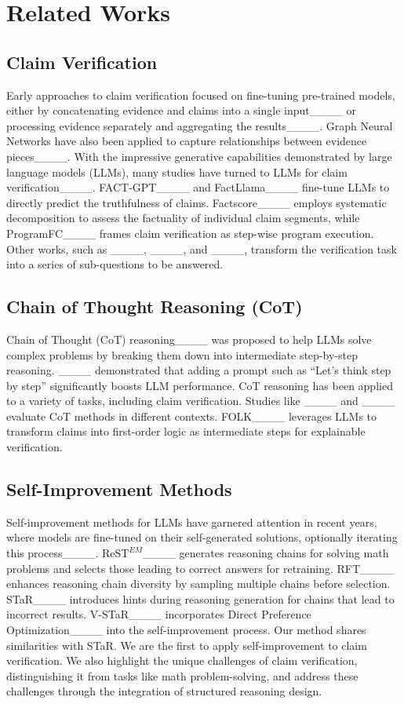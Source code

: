 \section{Related Works}
\subsection{Claim Verification}

Early approaches to claim verification focused on fine-tuning pre-trained models, either by concatenating evidence and claims into a single input____ or processing evidence separately and aggregating the results____. Graph Neural Networks have also been applied to capture relationships between evidence pieces____. With the impressive generative capabilities demonstrated by large language models (LLMs), many studies have turned to LLMs for claim verification____. FACT-GPT____ and FactLlama____ fine-tune LLMs to directly predict the truthfulness of claims. Factscore____ employs systematic decomposition to assess the factuality of individual claim segments, while ProgramFC____ frames claim verification as step-wise program execution. Other works, such as ____, ____, and ____, transform the verification task into a series of sub-questions to be answered.


\subsection{Chain of Thought Reasoning (CoT)}
Chain of Thought (CoT) reasoning____ was proposed to help LLMs solve complex problems by breaking them down into intermediate step-by-step reasoning. ____ demonstrated that adding a prompt such as ``Let's think step by step'' significantly boosts LLM performance. CoT reasoning has been applied to a variety of tasks, including claim verification. Studies like ____ and ____ evaluate CoT methods in different contexts. FOLK____ leverages LLMs to transform claims into first-order logic as intermediate steps for explainable verification.

\subsection{Self-Improvement Methods}
Self-improvement methods for LLMs have garnered attention in recent years, where models are fine-tuned on their self-generated solutions, optionally iterating this process____. $\text{ReST}^{EM}$____ generates reasoning chains for solving math problems and selects those leading to correct answers for retraining. RFT____ enhances reasoning chain diversity by sampling multiple chains before selection. STaR____ introduces hints during reasoning generation for chains that lead to incorrect results. V-STaR____ incorporates Direct Preference Optimization____ into the self-improvement process. Our method shares similarities with STaR. We are the first to apply self-improvement to claim verification. We also highlight the unique challenges of claim verification, distinguishing it from tasks like math problem-solving, and address these challenges through the integration of structured reasoning design.